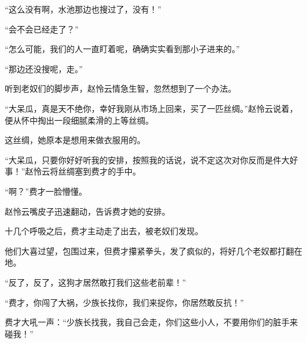 \begin{this_body}
“这么没有啊，水池那边也搜过了，没有！”

“会不会已经走了？”

“怎么可能，我们的人一直盯着呢，确确实实看到那小子进来的。”

“那边还没搜呢，走。”

听到老奴们的脚步声，赵怜云情急生智，忽然想到了一个办法。

“大呆瓜，真是天不绝你，幸好我刚从市场上回来，买了一匹丝绸。”赵怜云说着，便从怀中掏出一段细腻柔滑的上等丝绸。

这丝绸，她原本是想用来做衣服用的。

“大呆瓜，只要你好好听我的安排，按照我的话说，说不定这次对你反而是件大好事！”赵怜云将丝绸塞到费才的手中。

“啊？”费才一脸懵懂。

赵怜云嘴皮子迅速翻动，告诉费才她的安排。

十几个呼吸之后，费才主动走了出去，被老奴们发现。

他们大喜过望，包围过来，但费才攥紧拳头，发了疯似的，将好几个老奴都打翻在地。

“反了，反了，这狗才居然敢打我们这些老前辈！”

“费才，你闯了大祸，少族长找你，我们来捉你，你居然敢反抗！”

费才大吼一声：“少族长找我，我自己会走，你们这些小人，不要用你们的脏手来碰我！”

\end{this_body}

